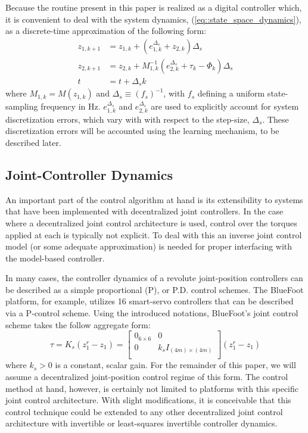 Because the routine present in this paper is realized as a digital controller which, it is convenient to 
deal with the system dynamics, (\ref{eq::state_space_dynamics}), as a discrete-time approximation of 
the following form:
	\begin{equation}
		\begin{split}
		{z}_{1,k+1} &= {z}_{1,k} + ( {e}_{1,k}^{\Delta_{s}} + {z}_{2,k} )\Delta_{s} \\
		{z}_{2,k+1} &= {z}_{2,k} + M^{-1}_{1,k}( {e}_{2,k}^{\Delta_{s}} + \tau_{k} - \Phi_{k}) \Delta_{s} \\
		t 			&= t + \Delta_{s} k 
		\end{split}
		\label{eq::sampled_dynamics}
	\end{equation}
where $M_{1,k} = M(z_{1,k})$ and $\Delta_{s} \equiv (f_{s})^{-1}$, with $f_{s}$ defining a uniform 
state-sampling frequency in Hz. ${e}_{1,k}^{\Delta_{s}}$ and ${e}_{2,k}^{\Delta_{s}}$ are used to explicitly 
account for system discretization errors, which vary with with respect to the step-size, $\Delta_{s}$. These
discretization errors will be accounted using the learning mechanism, to be described later.


\subsection{Joint-Controller Dynamics}


An important part of the control algorithm at hand is its extensibility to systems that have been implemented 
with decentralized joint controllers. In the case where a decentralized joint control architecture is used, 
control over the torques applied at each is typically not explicit. To deal with this an inverse joint control 
model (or some adequate approximation) is needed for proper interfacing with the model-based controller.

In many cases, the controller dynamics of a revolute joint-position controllers can be described as a simple 
proportional (P), or P.D. control schemes. The BlueFoot platform, for example, utilizes 16 smart-servo controllers
that can be described via a P-control scheme. Using the introduced notations, BlueFoot's joint control scheme takes 
the follow aggregate form:
	\begin{equation}
		\tau = K_{s} (z_{1}^{r}-z_{1}) = 
		\left[\begin{array}{cc}
		0_{6\times6}	& 	0	\\
		0				&	k_{s} I_{(4m)\times(4m)}	\\
		\end{array}\right] (z_{1}^{r}-z_{1})
		\label{eq::servo_control_dynamics}
	\end{equation}
where $k_{s}>0$ is a constant, scalar gain. For the remainder of this paper, we will assume a decentralized 
joint-position control regime of this form. The control method at hand, however, is certainly not limited to 
platforms with this specific joint control architecture. With slight modifications, it is conceivable that this control
technique could be extended to any other decentralized joint control architecture with invertible or least-squares
invertible controller dynamics.